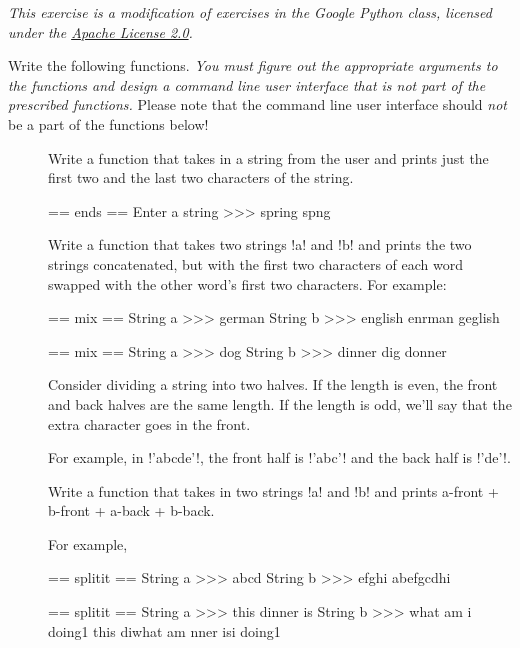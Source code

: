 \documentclass[11pt]{cselabheader}
\begin{document}
\begin{ex}[stringfun.py] 
\emph{This exercise is a modification of exercises in the Google Python
  class, licensed under the
  \href{http://www.apache.org/licenses/LICENSE-2.0.html}{Apache License 2.0}.}

Write the following functions. \emph{You must figure out the appropriate
  arguments to the functions and design a command line user interface that is
not part of the prescribed functions.} Please note that the command line user
interface should \emph{not} be a part of the functions below!

\begin{description}
  \item[]
  Write a function that takes in a string from the user and
  prints just the first two and the last two characters of the string.

  \begin{verbatimcode}
== ends ==
Enter a string >>> spring
spng
  \end{verbatimcode}

  \item[]
Write a function that takes two strings \pythoninline!a! and
  \pythoninline!b! and prints the two strings concatenated, but with the first
  two characters of each word swapped with the other word's first two
  characters. For example:

  \begin{verbatimcode}
== mix ==
String a >>> german
String b >>> english
enrman geglish
  \end{verbatimcode}

  \begin{verbatimcode}
== mix ==
String a >>> dog
String b >>> dinner
dig donner
  \end{verbatimcode}

  \item[]
Consider dividing a string into two halves. If the length
  is even, the front and back halves are the same length. If the length is odd,
  we'll say that the extra character goes in the front. 

  For example, in \pythoninline!'abcde'!, the front half is \pythoninline!'abc'!
  and the back half is \pythoninline!'de'!. 

  Write a function that takes in two strings \pythoninline!a! and
  \pythoninline!b!  and prints a-front + b-front + a-back + b-back.

  For example,

  \begin{verbatimcode}
== splitit ==
String a >>> abcd
String b >>> efghi
abefgcdhi
  \end{verbatimcode}

  \begin{verbatimcode}
== splitit ==
String a >>> this dinner is
String b >>> what am i doing1
this diwhat am nner isi doing1
  \end{verbatimcode}
\end{description}

\end{ex}
\end{document}
